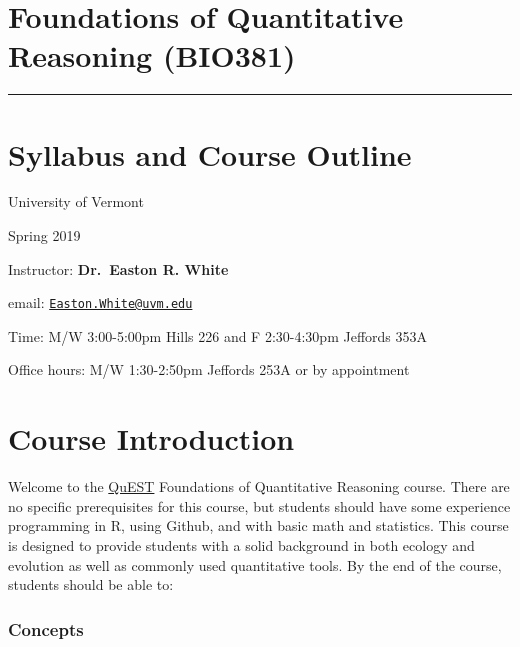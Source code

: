 \documentclass[12pt,]{article}
\title{}
\author{}
\date{}
\begin{document}
\section{Foundations of Quantitative Reasoning
(BIO381)}\label{foundations-of-quantitative-reasoning-bio381}

\begin{center}\rule{0.5\linewidth}{\linethickness}\end{center}

\section{Syllabus and Course Outline}\label{syllabus-and-course-outline}

University of Vermont

Spring 2019

Instructor: \textbf{Dr.~Easton R. White}

email:
\href{mailto:Easton.White@uvm.edu}{\nolinkurl{Easton.White@uvm.edu}}

Time: M/W 3:00-5:00pm Hills 226 and F 2:30-4:30pm Jeffords 353A

Office hours: M/W 1:30-2:50pm Jeffords 253A or by appointment

\section{Course Introduction}\label{course-introduction}

Welcome to the \href{https://www.uvm.edu/quest}{QuEST} Foundations of
Quantitative Reasoning course. There are no specific prerequisites for
this course, but students should have some experience programming in R,
using Github, and with basic math and statistics. This course is
designed to provide students with a solid background in both ecology and
evolution as well as commonly used quantitative tools. By the end of the
course, students should be able to:

\subsubsection{Concepts}\label{concepts}
\end{document}
